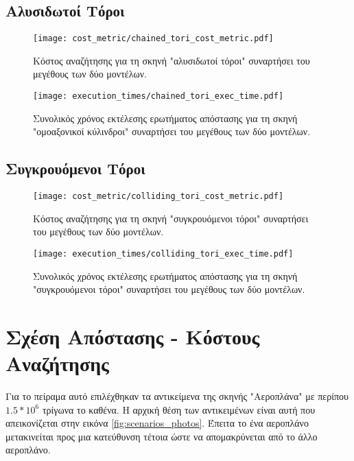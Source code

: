 \subsection{Αλυσιδωτοί Τόροι}
\begin{figure}[H]
    \centering
    \texttt{[image: cost\_metric/chained\_tori\_cost\_metric.pdf]}
    \caption[Κόστος Αναζήτησης για "αλυσιδωτοί τόροι"] {
        Κόστος αναζήτησης για τη σκηνή "αλυσιδωτοί τόροι" συναρτήσει 
        του μεγέθους των δύο μοντέλων.
    }
\end{figure}

\begin{figure}[H]
    \centering
    \texttt{[image: execution\_times/chained\_tori\_exec\_time.pdf]}
    \caption[Συνολικός Χρόνος Εκτέλεσης για "ομοαξονικοί κύλινδροι"] {
        Συνολικός χρόνος εκτέλεσης ερωτήματος απόστασης 
        για τη σκηνή "ομοαξονικοί κύλινδροι" συναρτήσει του μεγέθους των δύο μοντέλων.
    }
\end{figure}

\subsection{Συγκρουόμενοι Τόροι}
\begin{figure}[H]
    \centering
    \texttt{[image: cost\_metric/colliding\_tori\_cost\_metric.pdf]}
    \caption[Κόστος Αναζήτησης για "συγκρουόμενοι τόροι"] {
        Κόστος αναζήτησης για τη σκηνή "συγκρουόμενοι τόροι" συναρτήσει 
        του μεγέθους των δύο μοντέλων.
    }
\end{figure}

\begin{figure}[H]
    \centering
    \texttt{[image: execution\_times/colliding\_tori\_exec\_time.pdf]}
    \caption[Συνολικός Χρόνος Εκτέλεσης για "συγκρουόμενοι τόροι"] {
        Συνολικός χρόνος εκτέλεσης ερωτήματος απόστασης 
        για τη σκηνή "συγκρουόμενοι τόροι" συναρτήσει του μεγέθους των δύο μοντέλων.
    }
\end{figure}


\section{Σχέση Απόστασης - Κόστους Αναζήτησης}
Για το πείραμα αυτό επιλέχθηκαν τα αντικείμενα της σκηνής 
"Αεροπλάνα" με περίπου $1.5 * 10^6$ τρίγωνα το καθένα.
Η αρχική θέση των αντικειμένων είναι αυτή που απεικονίζεται 
στην εικόνα \ref{fig:scenarios_photos}.
Έπειτα το ένα αεροπλάνο μετακινείται 
προς μια κατεύθυνση τέτοια ώστε να απομακρύνεται 
από το άλλο αεροπλάνο.

